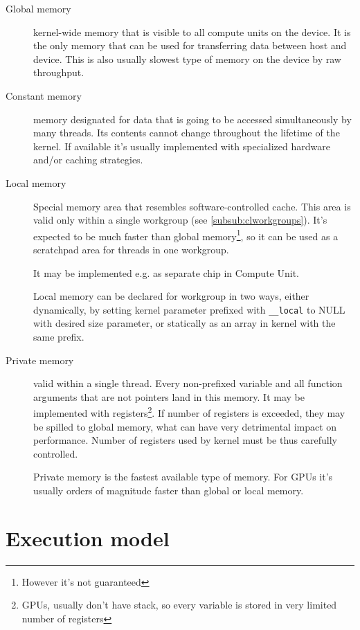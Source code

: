 \begin{description}
  \item[Global memory]
    kernel-wide memory that is visible to all compute units on the device.
    It is the only memory that can be used for transferring data between host and
    device. This is also usually slowest type of memory on the device by raw
    throughput.
  \item[Constant memory]
    memory designated for data that is going to be accessed simultaneously by
    many threads. Its contents cannot change throughout the lifetime of the
    kernel. If available it's usually implemented with specialized hardware
    and/or caching strategies.
  \item[Local memory]
    Special memory area that resembles software-controlled cache. This area is
    valid only within a single workgroup (see \autoref{subsub:clworkgroups}). It's
    expected to be much faster than global memory\footnote{However it's not guaranteed},
    so it can be used as a scratchpad area for threads in one workgroup.

    It may be implemented e.g. as separate chip in Compute Unit.

    Local memory can be declared for workgroup in two ways, either dynamically,
    by setting kernel parameter prefixed with \texttt{\_\_local} to NULL with
    desired size parameter, or statically as an array in kernel with the same
    prefix.

  \item[Private memory]
    valid within a single thread. Every non-prefixed variable and all function
    arguments that are not pointers land in this memory. It may be implemented
    with registers\footnote{GPUs, usually don't have stack, so every variable
    is stored in very limited number of registers}. If number of registers is
    exceeded, they may be spilled to global memory, what can have very
    detrimental impact on performance. Number of registers used by kernel must
    be thus carefully controlled.

    Private memory is the fastest available type of memory. For GPUs it's usually
    orders of magnitude faster than global or local memory.
\end{description}

\section{Execution model}
\label{sec:clexecmodel}

